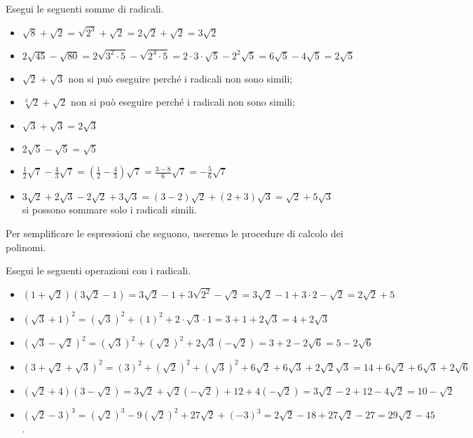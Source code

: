 % 
\begin{esempio}{}{}
Esegui le seguenti somme di radicali.
\begin{itemize} [left=0mm]
\item \(\sqrt 8+\sqrt{2}=\sqrt{2^3}+\sqrt{2}=2\sqrt{2}+\sqrt{2}=3\sqrt{2}\)
\item \(2\sqrt{45}-\sqrt{80}=2\sqrt{3^2\cdot 5}-\sqrt{2^4\cdot 5}=
      2\cdot 3\cdot \sqrt 5-2^2\sqrt 5=6\sqrt 5-4\sqrt 5=2\sqrt 5\)
\item \(\sqrt{2}+\sqrt{3}\)
non si può eseguire perché i radicali non sono simili;
\item \(\sqrt[3]2+\sqrt{2}\)
non si può eseguire perché i radicali non sono simili;
\item \(\sqrt{3}+\sqrt{3}=2\sqrt{3}\)
\item \(2\sqrt 5-\sqrt 5=\sqrt 5\)
\item \(\frac 1 2\sqrt 7-\frac 4 3\sqrt 7=
      \left(\frac 1 2-\frac 4 3\right)\sqrt 7=\frac{3-8} 6\sqrt 7=
      -\frac 5 6\sqrt 7\)
\item \(3\sqrt{2}+2\sqrt{3}-2\sqrt{2}+3\sqrt{3}=(3-2)\sqrt{2}+(2+3)\sqrt{3}=
      \sqrt{2}+5\sqrt{3}\)\\
si possono sommare solo i radicali simili.
\end{itemize}
\end{esempio}
% 

Per semplificare le espressioni che seguono, useremo le procedure di 
calcolo dei polinomi.


% 
\begin{esempio}{}{}
Esegui le seguenti operazioni con i radicali.
\begin{itemize} [left=0mm]
\item \((1+\sqrt{2})(3\sqrt{2}-1)=3\sqrt{2}-1+3\sqrt {2^2}-\sqrt{2}=
      3\sqrt{2}-1+3\cdot 2-\sqrt{2}=2\sqrt{2}+5\)
\item \((\sqrt{3}+1)^2=(\sqrt{3})^2+(1)^2+2\cdot \sqrt{3}\cdot 1=
      3+1+2\sqrt{3}=4+2\sqrt{3}\)
\item \((\sqrt{3}-\sqrt{2})^2=(\sqrt{3})^2+(\sqrt{2})^2+2 \sqrt{3} 
(-\sqrt{2})=
      3+2-2\sqrt 6=5-2\sqrt 6\)
\item \((3+\sqrt{2}+\sqrt{3})^2=
      (3)^2+(\sqrt{2})^2+(\sqrt{3})^2+6 \sqrt{2}+6 \sqrt{3}+2 \sqrt{2} 
\sqrt{3}=
      14+6\sqrt{2}+6\sqrt{3}+2\sqrt 6\)
\item \((\sqrt{2}+4)(3-\sqrt{2})=3\sqrt{2} 
+\sqrt{2}(-\sqrt{2})+12+4(-\sqrt{2})=
      3\sqrt{2}-2+12-4\sqrt{2}=10-\sqrt{2}\)
\item \((\sqrt{2}-3)^3=(\sqrt{2})^3-9(\sqrt{2})^2+27\sqrt{2}+(-3)^3=
      2\sqrt{2}-18+27\sqrt{2}-27=29\sqrt{2}-45\).
\end{itemize}
\end{esempio}
% 

